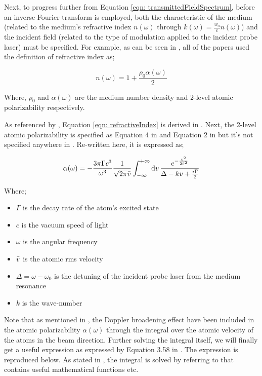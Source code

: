 Next, to progress further from Equation \ref{eqn: transmittedFieldSpectrum}, before an inverse Fourier transform is employed, both the characteristic of the medium (related to the medium's refractive index $n(\omega)$ through $k(\omega) = \frac{w_{0}}{c} n(\omega)$) and the incident field (related to the type of modulation applied to the incident probe laser) must be specified. For example, as can be seen in , all of the papers used the definition of refractive index as;

\begin{equation}
    n(\omega) = 1 + \frac{\rho_{0} \alpha(\omega)}{2}
    \label{eqn: refractiveIndex}
\end{equation}

Where, $\rho_{0}$ and $\alpha(\omega)$ are the medium number density and 2-level atomic polarizability respectively.

As referenced by , Equation \ref{eqn: refractiveIndex} is derived in \cite{hecht1974optics}. Next, the 2-level atomic polarizability is specified as Equation 4 in \cite{Kwong2014} and Equation 2 in \cite{Kwong2015} but it's not specified anywhere in \cite{Chalony2011}. Re-written here, it is expressed as;

\begin{equation}
    \alpha(\omega) = -\frac{3\pi\Gamma c^{3}}{\omega^{3}} \frac{1}{\sqrt{2\pi}\Bar{v}} \int_{-\infty}^{+\infty} \dd{v} \frac{e^{-\frac{v^{2}}{2\Bar{v}^{2}}}}{\Delta - kv + \frac{i\Gamma}{2}}
    \label{eqn: alphaGeneral}
\end{equation}

Where;

\begin{itemize}
    \item $\Gamma$ is the decay rate of the atom's excited state
    \item $c$ is the vacuum speed of light
    \item $\omega$ is the angular frequency
    \item $\Bar{v}$ is the atomic rms velocity 
    \item $\Delta = \omega - \omega_{0}$ is the detuning of the incident probe laser from the medium resonance
    \item $k$ is the wave-number
\end{itemize}

Note that as mentioned in , the Doppler broadening effect have been included in the atomic polarizability $\alpha(\omega)$ through the integral over the atomic velocity of the atoms in the beam direction. Further solving the integral itself, we will finally get a useful expression as expressed by Equation 3.58 in . The expression is reproduced below. As stated in , the integral is solved by referring to  that contains useful mathematical functions etc.

